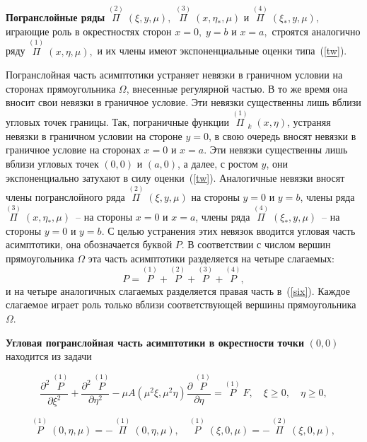 \documentclass[12pt]{article}
\begin{document}

{\bf Погранслойные ряды} \; $\overset{(2)}{\Pi} \; (\xi, y, \mu),$ \;$\overset{(3)}{\Pi} \; (x, \eta_*, \mu)$ и 
$\overset{(4)}{\Pi} \; (\xi_*, y, \mu),$ играющие роль в окрестностях сторон $x = 0,\; y = b$ и $x = a,$ строятся аналогично ряду $\overset{(1)}{\Pi} \; (x, \eta, \mu),$ и их члены имеют экспоненциальные оценки типа~(\ref {tw}).

Погранслойная часть асимптотики устраняет невязки в граничном условии на сторонах прямоугольника $\Omega$, внесенные регулярной частью. В то же время она вносит свои невязки в граничное условие. Эти невязки существенны лишь вблизи угловых точек границы. Так, пограничные функции $\overset{(1)}{\Pi}_k \; (x, \eta)$, устраняя невязки в граничном условии на стороне $y = 0$, в свою очередь вносят невязки в граничное условие на сторонах $x = 0$ и $x = a$. Эти невязки существенны лишь вблизи угловых точек $(0, 0)$ и $(a, 0)$, а далее, с ростом $y$, они экспоненциально затухают в силу оценки~(\ref {tw}). Аналогичные невязки вносят члены погранслойного ряда $\overset{(2)}{\Pi} \; (\xi, y, \mu)$ на стороны $y = 0$ и $y = b$, члены ряда $\overset{(3)}{\Pi} \; (x, \eta_*, \mu)$~-- на стороны $x = 0$ и $x = a$, члены ряда $\overset{(4)}{\Pi} \; (\xi_*, y, \mu)$~-- на стороны $y = 0$ и $y = b$. С целью устранения этих невязок вводится угловая часть асимптотики, она обозначается буквой $P$. В соответствии с числом вершин прямоугольника $\Omega$ эта часть асимптотики разделяется на четыре слагаемых:
\begin{equation} \label {P4}
	P = \overset{(1)}{P}+ \overset{(2)}{P} + \overset{(3)}{P} + \overset{(4)}{P},
\end{equation}
и на четыре аналогичных слагаемых разделяется правая часть в~(\ref {six}). Каждое слагаемое играет роль только вблизи соответствующей вершины прямоугольника $\Omega$.

{\bf Угловая погранслойная часть асимптотики в окрестности точки} $(0, 0)$ находится из задачи

\begin{equation*}
	\frac{\partial^2 \; \overset{(1)}{P}}{\partial \xi^2} + \frac{\partial^2 \; \overset{(1)}{P}}{\partial \eta^2} - \mu A (\mu^2 \xi, \mu^2 \eta) \frac{\partial \; \overset{(1)}{P}}{\partial \eta} = \overset{(1)}{P} \; F, \quad \xi \ge 0, \quad \eta \ge 0,
\end{equation*}

\begin{equation*}
	\overset{(1)}{P} \; (0, \eta, \mu) = -\, \overset{(1)}{\Pi} \; (0, \eta, \mu), \quad \overset{(1)}{P} \; (\xi, 0, \mu) = -\, \overset{(2)}{\Pi} \; (\xi, 0, \mu),
\end{equation*}
\end{document}
